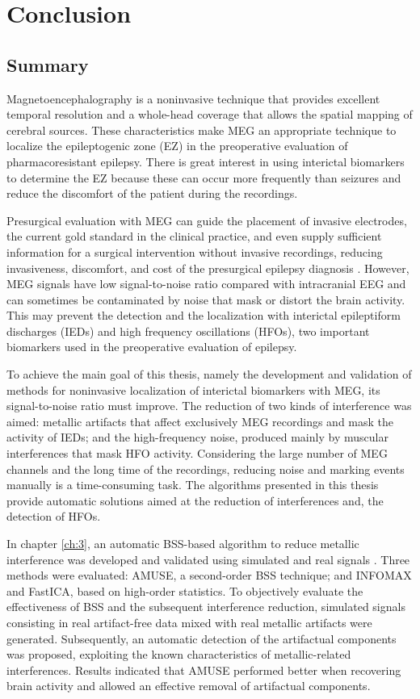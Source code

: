 \chapter{Conclusion}
\label{ch:conclusions}

\section{Summary}

Magnetoencephalography is a noninvasive technique that provides excellent temporal resolution and a whole-head coverage that allows the spatial mapping of cerebral sources. These characteristics make MEG an appropriate technique to localize the epileptogenic zone (EZ) in the preoperative evaluation of pharmacoresistant epilepsy. There is great interest in using interictal biomarkers to determine the EZ because these can occur more frequently than seizures \citep{Staba2014} and reduce the discomfort of the patient during the recordings. 

Presurgical evaluation with MEG can guide the placement of invasive electrodes, the current gold standard in the clinical practice, and even supply sufficient information for a surgical intervention without invasive recordings, reducing invasiveness, discomfort, and cost of the presurgical epilepsy diagnosis \citep{Aydin2015}. However, MEG signals have low signal-to-noise ratio compared with intracranial EEG and can sometimes be contaminated by noise that mask or distort the brain activity. This may prevent the detection and the localization with interictal epileptiform discharges (IEDs) and high frequency oscillations (HFOs), two important biomarkers used in the preoperative evaluation of epilepsy. 

To achieve the main goal of this thesis, namely the development and validation of methods for noninvasive localization of interictal biomarkers with MEG, its signal-to-noise ratio must improve. The reduction of two kinds of interference was aimed: metallic artifacts that affect exclusively MEG recordings and mask the activity of IEDs; and the high-frequency noise, produced mainly by muscular interferences that mask HFO activity. Considering the large number of MEG channels and the long time of the recordings, reducing noise and marking events manually is a time-consuming task. The algorithms presented in this thesis provide automatic solutions aimed at the reduction of interferences and, the detection of HFOs. 

In chapter \ref{ch:3}, an automatic BSS-based algorithm to reduce metallic interference was developed and validated using simulated and real signals \citep{Migliorelli2015}. Three methods were evaluated: AMUSE, a second-order BSS technique; and INFOMAX and FastICA, based on high-order statistics. To objectively evaluate the effectiveness of BSS and the subsequent interference reduction, simulated signals consisting in real artifact-free data mixed with real metallic artifacts were generated. Subsequently, an automatic detection of the artifactual components was proposed, exploiting the known characteristics of metallic-related interferences. Results indicated that AMUSE performed better when recovering brain activity and allowed an effective removal of artifactual components.

